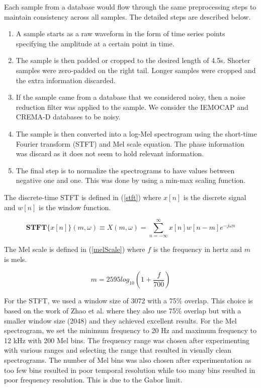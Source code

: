 \documentclass[conference]{IEEEtran}
\begin{document}
Each sample from a database would flow through the same preprocessing steps to maintain consistency across all samples. The detailed steps are described below.
\begin{enumerate}
	\item A sample starts as a raw waveform in the form of time series points specifying the amplitude at a certain point in time.
	\item The sample is then padded or cropped to the desired length of 4.5s. Shorter samples were zero-padded on the right tail. Longer samples were cropped and the extra information discarded.
	\item If the sample came from a database that we considered noisy, then a noise reduction filter was applied to the sample. We consider the IEMOCAP and CREMA-D databases to be noisy.
	\item The sample is then converted into a log-Mel spectrogram using the short-time Fourier transform (STFT) and Mel scale equation. The phase information was discard as it does not seem to hold relevant information. \cite{Kozakowski2017}
	\item The final step is to normalize the spectrograms to have values between negative one and one. This was done by using a min-max scaling function.
\end{enumerate}

The discrete-time STFT is defined in (\ref{stft}) where $x[n]$ is the discrete signal and $w[n]$ is the window function.

\begin{equation}
	\label{stft}
	\mathbf{STFT}\{x[n]\}(m,\omega) \equiv X(m,\omega) = \sum_{n=-\infty}^{\infty}x[n]w[n-m]e^{-j \omega n}
\end{equation}

The Mel scale is defined in (\ref{melScale}) where $f$ is the frequency in hertz and $m$ is mels.\cite{Oshaughnessy1990}

\begin{equation}
\label{melScale}
m = 2595 log_{10}(1 + \frac{f}{700})
\end{equation}

For the STFT, we used a window size of 3072 with a 75\% overlap. This choice is based on the work of Zhao et al. \cite{Zhao2019} where they also use 75\% overlap but with a smaller window size (2048) and they achieved excellent results. For the Mel spectrogram, we set the minimum frequency to 20 Hz and maximum frequency to 12 kHz with 200 Mel bins. The frequency range was chosen after experimenting with various ranges and selecting the range that resulted in visually clean spectrograms. The number of Mel bins was also chosen after experimentation as too few bins resulted in poor temporal resolution while too many bins resulted in poor frequency resolution. This is due to the Gabor limit.
\end{document}
